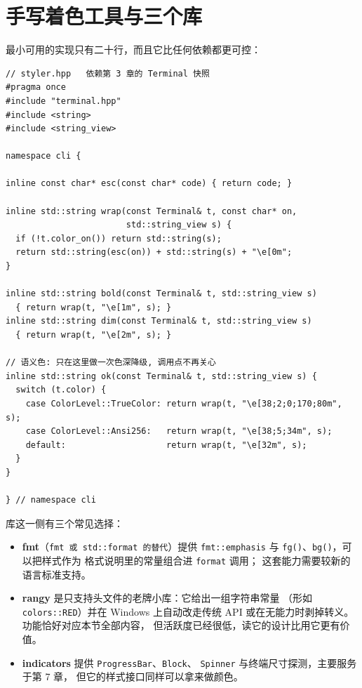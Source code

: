 \documentclass[12pt,a4paper,fontset=fandol]{ctexbook}
\newcommand{\Tp}[1]{\texttt{#1}}
\begin{document}
\section{手写着色工具与三个库}

最小可用的实现只有二十行，而且它比任何依赖都更可控：

\begin{lstlisting}[caption={二十行着色工具（terminal.hpp 的下游）}]
// styler.hpp   依赖第 3 章的 Terminal 快照
#pragma once
#include "terminal.hpp"
#include <string>
#include <string_view>

namespace cli {

inline const char* esc(const char* code) { return code; }

inline std::string wrap(const Terminal& t, const char* on,
                        std::string_view s) {
  if (!t.color_on()) return std::string(s);
  return std::string(esc(on)) + std::string(s) + "\e[0m";
}

inline std::string bold(const Terminal& t, std::string_view s)
  { return wrap(t, "\e[1m", s); }
inline std::string dim(const Terminal& t, std::string_view s)
  { return wrap(t, "\e[2m", s); }

// 语义色: 只在这里做一次色深降级, 调用点不再关心
inline std::string ok(const Terminal& t, std::string_view s) {
  switch (t.color) {
    case ColorLevel::TrueColor: return wrap(t, "\e[38;2;0;170;80m", s);
    case ColorLevel::Ansi256:   return wrap(t, "\e[38;5;34m", s);
    default:                    return wrap(t, "\e[32m", s);
  }
}

} // namespace cli
\end{lstlisting}

库这一侧有三个常见选择：

\begin{itemize}
\item \textbf{fmt}（\Tp{{fmt} 或 std::format 的替代}）提供
      \Tp{fmt::emphasis} 与 \Tp{fg()}、\Tp{bg()}，可以把样式作为
      格式说明里的常量组合进 \Tp{format} 调用；
      这套能力需要较新的语言标准支持。
\item \textbf{rangy} 是只支持头文件的老牌小库：它给出一组字符串常量
      （形如 \Tp{colors::RED}）并在 Windows 上自动改走传统 API
      或在无能力时剥掉转义。功能恰好对应本节全部内容，
      但活跃度已经很低，读它的设计比用它更有价值。
\item \textbf{indicators} 提供 \Tp{ProgressBar}、\Tp{Block}、
      \Tp{Spinner} 与终端尺寸探测，主要服务于第 7 章，
      但它的样式接口同样可以拿来做颜色。
\end{itemize}
\end{document}
